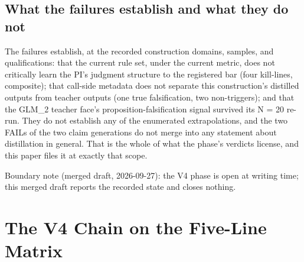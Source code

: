 \documentclass[11pt]{article}
\begin{document}
\subsection{What the failures establish and what they do not}
\noindent The failures establish, at the recorded construction domains, samples, and qualifications: that the current rule set, under the current metric, does not critically learn the PI's judgment structure to the registered bar (four kill-lines, composite); that call-side metadata does not separate this construction's distilled outputs from teacher outputs (one true falsification, two non-triggers); and that the GLM\_2 teacher face's proposition-falsification signal survived its N = 20 re-run. They do not establish any of the enumerated extrapolations, and the two FAILs of the two claim generations do not merge into any statement about distillation in general. That is the whole of what the phase's verdicts license, and this paper files it at exactly that scope.\par
\noindent Boundary note (merged draft, 2026-09-27): the V4 phase is open at writing time; this merged draft reports the recorded state and closes nothing.\par
\section{The V4 Chain on the Five-Line Matrix}
\label{sec:17}
\end{document}
